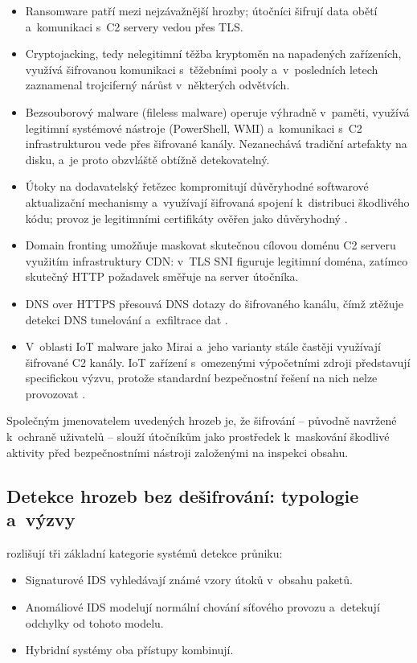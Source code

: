 \begin{itemize}
\item Ransomware patří mezi nejzávažnější hrozby; útočníci šifrují data obětí a~komunikaci s~C2 servery vedou přes TLS.
\item Cryptojacking, tedy nelegitimní těžba kryptoměn na napadených zařízeních, využívá šifrovanou komunikaci s~těžebními pooly a~v~posledních letech zaznamenal trojciferný nárůst v~některých odvětvích.
\item Bezsouborový malware (fileless malware) operuje výhradně v~paměti, využívá legitimní systémové nástroje (PowerShell, WMI) a~komunikaci s~C2 infrastrukturou vede přes šifrované kanály. Nezanechává tradiční artefakty na disku, a~je proto obzvláště obtížně detekovatelný.
\item Útoky na dodavatelský řetězec kompromitují důvěryhodné softwarové aktualizační mechanismy a~využívají šifrovaná spojení k~distribuci škodlivého kódu; provoz je legitimními certifikáty ověřen jako důvěryhodný \parencite{Ferdous2023}.
\item Domain fronting umožňuje maskovat skutečnou cílovou doménu C2 serveru využitím infrastruktury CDN: v~TLS SNI figuruje legitimní doména, zatímco skutečný HTTP požadavek směřuje na server útočníka.
\item DNS over HTTPS přesouvá DNS dotazy do šifrovaného kanálu, čímž ztěžuje detekci DNS tunelování a~exfiltrace dat \parencite{Papadogiannaki2022}.
\item V~oblasti IoT malware jako Mirai a~jeho varianty stále častěji využívají šifrované C2 kanály. IoT zařízení s~omezenými výpočetními zdroji představují specifickou výzvu, protože standardní bezpečnostní řešení na nich nelze provozovat \parencite{Ferdous2023}.
\end{itemize}

Společným jmenovatelem uvedených hrozeb je, že šifrování -- původně navržené k~ochraně uživatelů -- slouží útočníkům jako prostředek k~maskování škodlivé aktivity před bezpečnostními nástroji založenými na inspekci obsahu.

\subsection{Detekce hrozeb bez dešifrování: typologie a~výzvy}
\label{sec:pristupy-identifikace}

\textcite{OzkanOkay2021} rozlišují tři základní kategorie systémů detekce průniku:

\begin{itemize}
\item Signaturové IDS vyhledávají známé vzory útoků v~obsahu paketů.
\item Anomáliové IDS modelují normální chování síťového provozu a~detekují odchylky od tohoto modelu.
\item Hybridní systémy oba přístupy kombinují.
\end{itemize}

